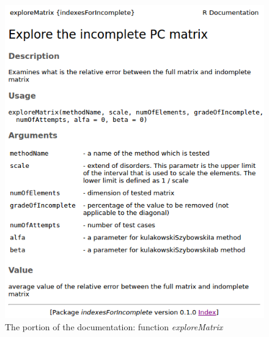 \begin{figure}[h]
\centerline{\includegraphics[scale=0.58]{images/kod33.png}}
\caption{The portion of the documentation: function \textit{exploreMatrix}}
\label{fig:rstudio}
\end{figure}